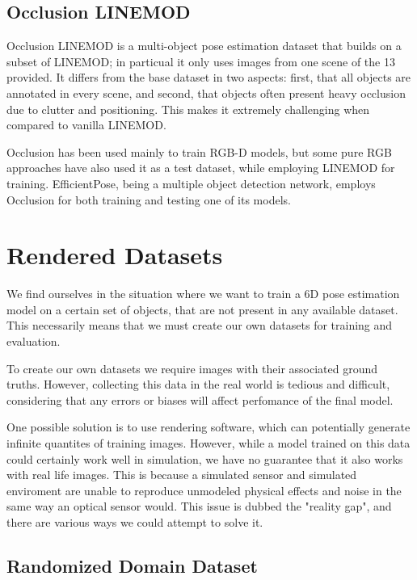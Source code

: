 \subsection{Occlusion LINEMOD}

Occlusion LINEMOD\cite{occlusionlinemod} is a multi-object pose estimation dataset that builds on a subset of LINEMOD; in particual it only uses images from one scene of the 13 provided. It differs from the base dataset in two aspects: first, that all objects are annotated in every scene, and second, that objects often present heavy occlusion due to clutter and positioning. This makes it extremely challenging when compared to vanilla LINEMOD.

Occlusion has been used mainly to train RGB-D models, but some pure RGB approaches \cite{PVNet}\cite{PoseCNN} have also used it as a test dataset, while employing LINEMOD for training. EfficientPose, being a multiple object detection network, employs Occlusion for both training and testing one of its models.

\section{Rendered Datasets}

We find ourselves in the situation where we want to train a 6D pose estimation model on a certain set of objects, that are not present in any available dataset. This necessarily means that we must create our own datasets for training and evaluation.

To create our own datasets we require images with their associated ground truths. However, collecting this data in the real world is tedious and difficult, considering that any errors or biases will affect perfomance of the final model. 

One possible solution is to use rendering software, which can potentially generate infinite quantites of training images. However, while a model trained on this data could certainly work well in simulation, we have no guarantee that it also works with real life images. This is because a simulated sensor and simulated enviroment are unable to reproduce unmodeled physical effects and noise in the same way an optical sensor would. This issue is dubbed the "reality gap"\cite{domainRandomization2}, and there are various ways we could attempt to solve it.

\subsection{Randomized Domain Dataset}

